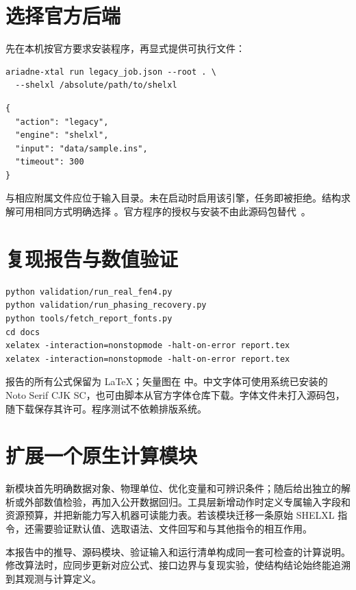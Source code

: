 \section{选择官方后端}
先在本机按官方要求安装程序，再显式提供可执行文件：
\begin{lstlisting}
ariadne-xtal run legacy_job.json --root . \
  --shelxl /absolute/path/to/shelxl
\end{lstlisting}
\begin{lstlisting}
{
  "action": "legacy",
  "engine": "shelxl",
  "input": "data/sample.ins",
  "timeout": 300
}
\end{lstlisting}
 与相应附属文件应位于输入目录。未在启动时启用该引擎，任务即被拒绝。结构求解可用相同方式明确选择 。官方程序的授权与安装不由此源码包替代~\cite{shelx_distribution}。

\section{复现报告与数值验证}
\begin{lstlisting}
python validation/run_real_fen4.py
python validation/run_phasing_recovery.py
python tools/fetch_report_fonts.py
cd docs
xelatex -interaction=nonstopmode -halt-on-error report.tex
xelatex -interaction=nonstopmode -halt-on-error report.tex
\end{lstlisting}
报告的所有公式保留为 LaTeX；矢量图在  中。中文字体可使用系统已安装的 Noto Serif CJK SC，也可由脚本从官方字体仓库下载。字体文件未打入源码包，随下载保存其许可。程序测试不依赖排版系统。

\section{扩展一个原生计算模块}
新模块首先明确数据对象、物理单位、优化变量和可辨识条件；随后给出独立的解析或外部数值检验，再加入公开数据回归。工具层新增动作时定义专属输入字段和资源预算，并把新能力写入机器可读能力表。若该模块迁移一条原始 SHELXL 指令，还需要验证默认值、选取语法、文件回写和与其他指令的相互作用。

本报告中的推导、源码模块、验证输入和运行清单构成同一套可检查的计算说明。修改算法时，应同步更新对应公式、接口边界与复现实验，使结构结论始终能追溯到其观测与计算定义。
